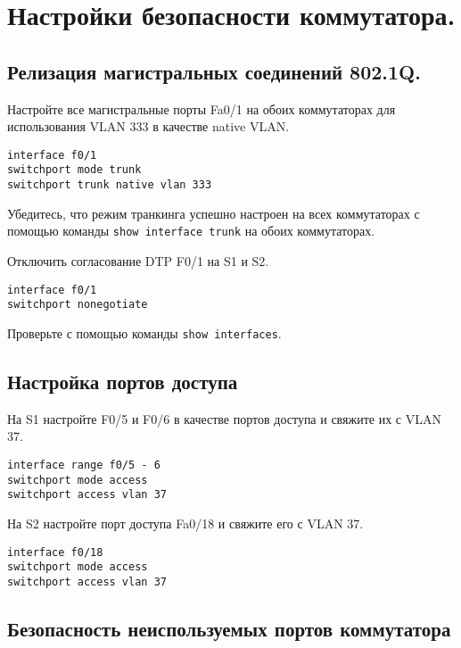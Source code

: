 \section{Настройки безопасности коммутатора.}

\subsection{Релизация магистральных соединений 802.1Q.}

Настройте все магистральные порты Fa0/1 на обоих коммутаторах
для использования VLAN 333 в качестве native VLAN.

\begin{verbatim}
interface f0/1
switchport mode trunk
switchport trunk native vlan 333
\end{verbatim}

Убедитесь, что режим транкинга успешно настроен на всех коммутаторах
с помощью команды \texttt{show interface trunk} на обоих коммутаторах.

Отключить согласование DTP F0/1 на S1 и S2.

\begin{verbatim}
interface f0/1
switchport nonegotiate
\end{verbatim}

Проверьте с помощью команды \texttt{show interfaces}.


\subsection{Настройка портов доступа}

На S1 настройте F0/5 и F0/6 в качестве портов доступа и свяжите их с VLAN 37.

\begin{verbatim}
interface range f0/5 - 6
switchport mode access
switchport access vlan 37
\end{verbatim}

На S2 настройте порт доступа Fa0/18 и свяжите его с VLAN 37.

\begin{verbatim}
interface f0/18
switchport mode access
switchport access vlan 37
\end{verbatim}

\subsection{Безопасность неиспользуемых портов коммутатора}

